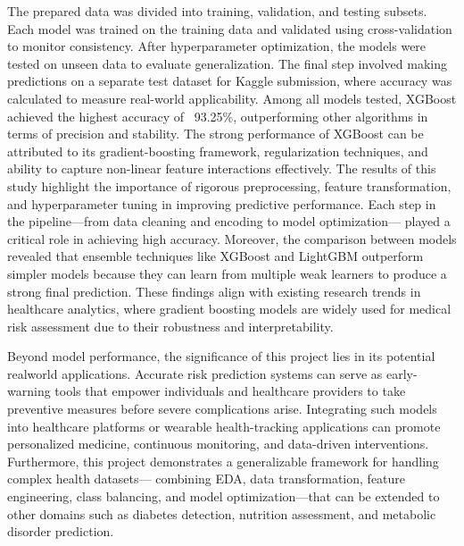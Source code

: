 The prepared data was divided into training, validation, and testing subsets.
Each model was trained on the training data and validated using cross-validation to monitor consistency.
After hyperparameter optimization, the models were tested on unseen data to evaluate generalization.
The final step involved making predictions on a separate test dataset for Kaggle submission, where accuracy was calculated to measure real-world applicability.
Among all models tested, XGBoost achieved the highest accuracy of ~93.25\%, outperforming other algorithms in terms of precision and stability.
The strong performance of XGBoost can be attributed to its gradient-boosting framework, regularization techniques, and ability to capture non-linear feature interactions effectively.
The results of this study highlight the importance of rigorous preprocessing, feature transformation, and hyperparameter tuning in improving predictive performance.
Each step in the pipeline—from data cleaning and encoding to model optimization— played a critical role in achieving high accuracy.
Moreover, the comparison between models revealed that ensemble techniques like XGBoost and LightGBM outperform simpler models because they can learn from multiple weak learners to produce a strong final prediction.
These findings align with existing research trends in healthcare analytics, where gradient boosting models are widely used for medical risk assessment due to their robustness and interpretability.

Beyond model performance, the significance of this project lies in its potential realworld applications.
Accurate risk prediction systems can serve as early-warning tools that empower individuals and healthcare providers to take preventive measures before severe complications arise.
Integrating such models into healthcare platforms or wearable health-tracking applications can promote personalized medicine, continuous monitoring, and data-driven interventions.
Furthermore, this project demonstrates a generalizable framework for handling complex health datasets— combining EDA, data transformation, feature engineering, class balancing, and model optimization—that can be extended to other domains such as diabetes detection, nutrition assessment, and metabolic disorder prediction.
